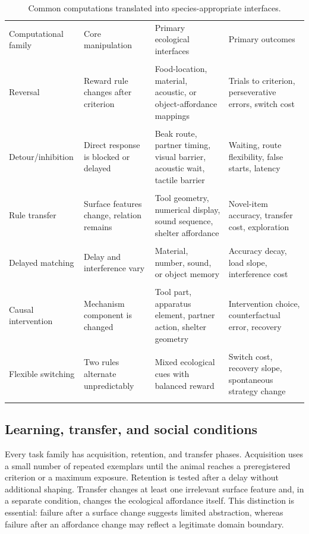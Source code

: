\documentclass[conference]{IEEEtran}
\begin{document}
\begin{table}[t]
\centering
\caption{Common computations translated into species-appropriate interfaces.}
\label{tab:modules}
\small
\begin{tabular}{p{2.2cm}p{3.1cm}p{3.1cm}p{5.0cm}}
\toprule
Computational family & Core manipulation & Primary ecological interfaces & Primary outcomes \\\\ 
\midrule
Reversal & Reward rule changes after criterion & Food-location, material, acoustic, or object-affordance mappings & Trials to criterion, perseverative errors, switch cost \\\\ 
Detour/inhibition & Direct response is blocked or delayed & Beak route, partner timing, visual barrier, acoustic wait, tactile barrier & Waiting, route flexibility, false starts, latency \\\\ 
Rule transfer & Surface features change, relation remains & Tool geometry, numerical display, sound sequence, shelter affordance & Novel-item accuracy, transfer cost, exploration \\\\ 
Delayed matching & Delay and interference vary & Material, number, sound, or object memory & Accuracy decay, load slope, interference cost \\\\ 
Causal intervention & Mechanism component is changed & Tool part, apparatus element, partner action, shelter geometry & Intervention choice, counterfactual error, recovery \\\\ 
Flexible switching & Two rules alternate unpredictably & Mixed ecological cues with balanced reward & Switch cost, recovery slope, spontaneous strategy change \\\\ 
\bottomrule
\end{tabular}
\end{table}

\subsection{Learning, transfer, and social conditions}
Every task family has acquisition, retention, and transfer phases. Acquisition uses a small number of repeated exemplars until the animal reaches a preregistered criterion or a maximum exposure. Retention is tested after a delay without additional shaping. Transfer changes at least one irrelevant surface feature and, in a separate condition, changes the ecological affordance itself. This distinction is essential: failure after a surface change suggests limited abstraction, whereas failure after an affordance change may reflect a legitimate domain boundary.
\end{document}
